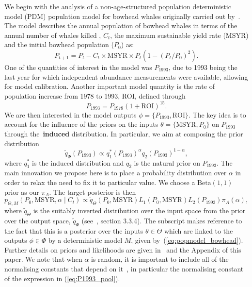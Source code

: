 \documentclass[12pt]{article}
\begin{document}
We begin with the analysis of a non-age-structured population deterministic model (PDM) population model for bowhead whales originally carried out by~\textcite{Poole2000}.
The model describes the annual population of bowhead whales in terms of the annual number of whales killed , $C_t$, the maximum sustainable yield rate (MSYR) and the initial bowhead population ($P_0$) as:
\begin{equation}
\label{eq:popmodel_bowhead}
 P_{t + 1} = P_t - C_t \times \text{MSYR} \times P_t \left( 1- (P_t/P_0)^2 \right).
\end{equation}
One of the quantities of interest in the model was $P_{\text{1993}}$, due to 1993 being the last year for which independent abundance measurements were available, allowing for model calibration.
Another important model quantity is the rate of population increase from 1978 to 1993, ROI, defined through
\begin{equation*}
 \label{eq:ROI_P1993}
P_{1993} = P_{1978}(1 + \text{ROI})^{15}. 
\end{equation*}
We are then interested in the model outputs $\phi = \{P_{1993}, \text{ROI}\}$.
The key idea is to account for the influence of the priors on the inputs $\theta = \{\text{MSYR}, P_0\}$ on $P_{1993}$ through the~\textbf{induced} distribution.
In particular, we aim at composing the prior distribution
\begin{equation}
 \label{eq:P1993_pool}
 \tilde{q}_{\Phi}(P_{1993}) \propto q_1^\ast(P_{1993})^\alpha q_2(P_{1993})^{1-\alpha},
\end{equation}
where $q_1^\ast$ is the induced distribution and $q_2$ is the natural prior on $P_{1993}$.
The main innovation we propose here is to place a probability distribution over $\alpha$ in order to relax the need to fix it to particular value.
We choose a $\text{Beta}(1, 1)$ prior as our $\pi_A$.
The target posterior is then 
\begin{equation}
 \label{eq:bowhead_posterior}
  p_{\Theta, M}(P_0, \text{MSYR}, \alpha \mid C_t) \propto \tilde{q}_{\Theta}(P_0, \text{MSYR}) L_1(P_0, \text{MSYR}) L_2(P_{1993})\pi_A(\alpha),
\end{equation}
where $\tilde{q}_{\Theta}$ is the suitably inverted distribution over the input space from the prior over the output space, $\tilde{q}_{\Phi}$ (see~\textcite{Poole2000}, section 3.3.4). 
The subscript makes reference to the fact that this is a posterior over the inputs $\theta \in \Theta$ which are linked to the outputs $\phi \in \Phi$ by a deterministic model $M$, given by~(\ref{eq:popmodel_bowhead}).
Further details on priors and likelihoods are given in~\textcite{Poole2000} and the Appendix of this paper.
We note that when $\alpha$ is random, it is important to include all of the normalising constants that depend on it~\parencite{Neuenschwander2009}, in particular the normalising constant of the expression in (\ref{eq:P1993_pool}).
\end{document}
